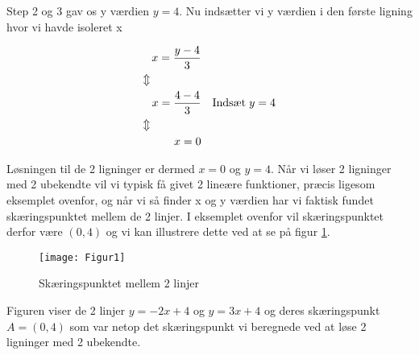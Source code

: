 Step 2 og 3 gav os y værdien $y = 4$. Nu indsætter vi y værdien i den første ligning hvor vi havde isoleret x

\begin{align*}
    x = \frac{y - 4}{3}\\
    \Updownarrow \hspace{1.6cm}&\\
    x = \frac{4 - 4}{3} && \text{Indsæt} \hspace{1mm} y = 4\\
    \Updownarrow \hspace{1.6cm}&\\
    x = 0
\end{align*}

Løsningen til de 2 ligninger er dermed $x = 0$ og $y = 4$. Når vi løser 2 ligninger med 2 ubekendte vil vi typisk få givet 2 lineære funktioner, præcis ligesom eksemplet ovenfor, og når vi så finder x og y værdien har vi faktisk fundet skæringspunktet mellem de 2 linjer. I eksemplet ovenfor vil skæringspunktet derfor være $(0,4)$ og vi kan illustrere dette ved at se på figur \ref{skæring}.

\begin{figure}[ht]
    \centering
    \texttt{[image: Figur1]}
    \caption{Skæringspunktet mellem 2 linjer}
    \label{skæring}
\end{figure}

Figuren viser de 2 linjer $y = -2x + 4$ og $y = 3x + 4$ og deres skæringspunkt $A = (0,4)$ som var netop det skæringspunkt vi beregnede ved at løse 2 ligninger med 2 ubekendte. 